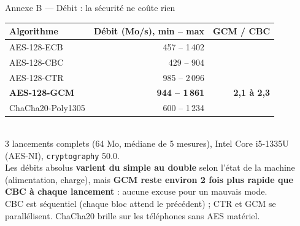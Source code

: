 \documentclass[aspectratio=169,10pt]{beamer}
\begin{document}
\begin{frame}{Annexe B --- Débit : la sécurité ne coûte rien}
  \centering
  \begin{tabular}{lrr}
    \toprule
    Algorithme & Débit (Mo/s), min -- max & GCM / CBC \\
    \midrule
    AES-128-ECB & 457 -- 1\,402 & \\
    AES-128-CBC & 429 -- 904 & \\
    AES-128-CTR & 985 -- 2\,096 & \\
    \textbf{AES-128-GCM} & \textbf{944 -- 1\,861} & \textbf{2,1 à 2,3} \\
    ChaCha20-Poly1305 & 600 -- 1\,234 & \\
    \bottomrule
  \end{tabular}\\[0.6em]
  \small 3 lancements complets (64 Mo, médiane de 5 mesures), Intel Core i5-1335U (AES-NI), \texttt{cryptography} 50.0.\\
  Les débits absolus \textbf{varient du simple au double} selon l'état de la machine (alimentation, charge),
  mais \textbf{GCM reste environ 2 fois plus rapide que CBC à chaque lancement} : aucune excuse pour un mauvais mode.\\
  \scriptsize CBC est séquentiel (chaque bloc attend le précédent) ; CTR et GCM se parallélisent.
  ChaCha20 brille sur les téléphones sans AES matériel.
\end{frame}
\end{document}
